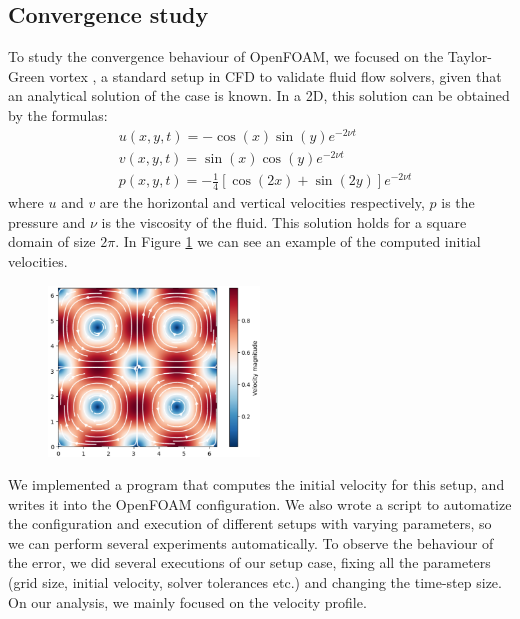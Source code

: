 \documentclass[
  english,        %
  font=times,     %
  onecolumn,      %
]{tumarticle}
\begin{document}
\subsection{Convergence study}

To study the convergence behaviour of OpenFOAM, we focused on the Taylor-Green vortex \cite{taylor1937mechanism, chorin1968numerical}, a standard setup in CFD to validate fluid flow solvers, given that an analytical solution of the case is known. In a 2D, this solution can be obtained by the formulas:
\begin{align}
    &u(x, y, t) = -\cos(x) \sin(y) e^{-2\nu t} \\
    &v(x, y, t) = \sin(x) \cos(y) e^{-2\nu t} \\
    &p(x, y, t) = -\frac{1}{4}\left[\cos(2x) + \sin(2y)\right]e^{-2\nu t}
\end{align}
where $u$ and $v$ are the horizontal and vertical velocities respectively, $p$ is the pressure and $\nu$ is the viscosity of the fluid. This solution holds for a square domain of size $2\pi$. In Figure \ref{fig:taylor-green} we can see an example of the computed initial velocities. 

\begin{figure}[!ht]
    \centering
    \includegraphics[width=0.5\textwidth]{resources/taylor-green-vortex.png}
    \caption{}
    \label{fig:taylor-green}
\end{figure}

We implemented a program that computes the initial velocity for this setup, and writes it into the OpenFOAM configuration. We also wrote a script to automatize the configuration and execution of different setups with varying parameters, so we can perform several experiments automatically.
To observe the behaviour of the error, we did several executions of our setup case, fixing all the parameters (grid size, initial velocity, solver tolerances etc.) and changing the time-step size. On our analysis, we mainly focused on the velocity profile.
\end{document}
